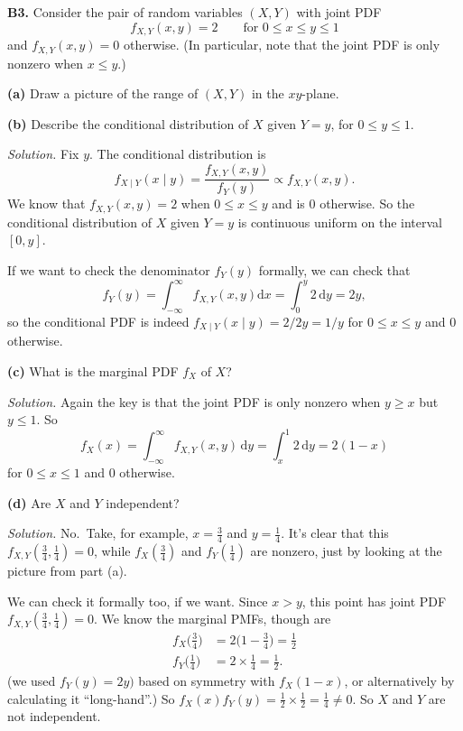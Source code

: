 \documentclass[
  a4paper,
]{book}
\theoremstyle{definition}
\theoremstyle{definition}
\theoremstyle{definition}
\theoremstyle{definition}
\theoremstyle{remark}
\begin{document}
\textbf{B3.} Consider the pair of random variables \((X,Y)\) with joint PDF
\[ f_{X,Y}(x,y) = 2 \qquad \text{for $0 \leq x \leq y \leq 1$} \]
and \(f_{X,Y}(x,y) = 0\) otherwise. (In particular, note that the joint PDF is only nonzero when \(x \leq y\).)

\textbf{(a)} Draw a picture of the range of \((X,Y)\) in the \(xy\)-plane.

\textbf{(b)} Describe the conditional distribution of \(X\) given \(Y = y\), for \(0 \leq y \leq 1\).

\begin{myanswers}

\emph{Solution.} Fix \(y\). The conditional distribution is
\[ f_{X \mid Y}(x \mid y) = \frac{f_{X,Y}(x,y)}{f_Y(y)} \propto f_{X,Y}(x,y) .\]
We know that \(f_{X,Y}(x,y) = 2\) when \(0 \leq x \leq y\) and is \(0\) otherwise. So the conditional distribution of \(X\) given \(Y = y\) is continuous uniform on the interval \([0, y]\).

If we want to check the denominator \(f_Y(y)\) formally, we can check that
\[ f_Y(y) = \int_{-\infty}^{\infty} f_{X,Y}(x,y) \mathrm dx = \int_0^y 2\, \mathrm dy = 2y ,\]
so the conditional PDF is indeed \(f_{X \mid Y}(x \mid y) = 2/2y = 1/y\) for \(0 \leq x \leq y\) and 0 otherwise.

\end{myanswers}

\textbf{(c)} What is the marginal PDF \(f_X\) of \(X\)?

\begin{myanswers}
\emph{Solution.} Again the key is that the joint PDF is only nonzero when \(y \geq x\) but \(y \leq 1\). So
\[ f_X(x) = \int_{-\infty}^\infty f_{X,Y}(x,y) \, \mathrm dy = \int_x^1 2 \, \mathrm dy = 2(1 - x)  \]
for \(0 \leq x \leq 1\) and 0 otherwise.

\end{myanswers}

\textbf{(d)} Are \(X\) and \(Y\) independent?

\begin{myanswers}
\emph{Solution.} No.~Take, for example, \(x = \frac34\) and \(y = \frac14\). It's clear that this \(f_{X,Y}(\frac34,\frac14) = 0\), while \(f_X(\frac34)\) and \(f_Y(\frac14)\) are nonzero, just by looking at the picture from part (a).

We can check it formally too, if we want. Since \(x > y\), this point has joint PDF \(f_{X,Y}(\frac34,\frac14) = 0\). We know the marginal PMFs, though are
\begin{align*}
f_X\big(\tfrac34\big) &= 2\big(1 - \tfrac34\big) = \tfrac12 \\
f_Y\big(\tfrac14\big) &= 2 \times \tfrac14 = \tfrac12 .
\end{align*}
(we used \(f_Y(y) = 2y)\) based on symmetry with \(f_X(1-x)\), or alternatively by calculating it ``long-hand''.)
So \(f_X(x)f_Y(y) = \tfrac12 \times \tfrac12 = \tfrac14 \neq 0\). So \(X\) and \(Y\) are not independent.

\end{myanswers}
\end{document}
